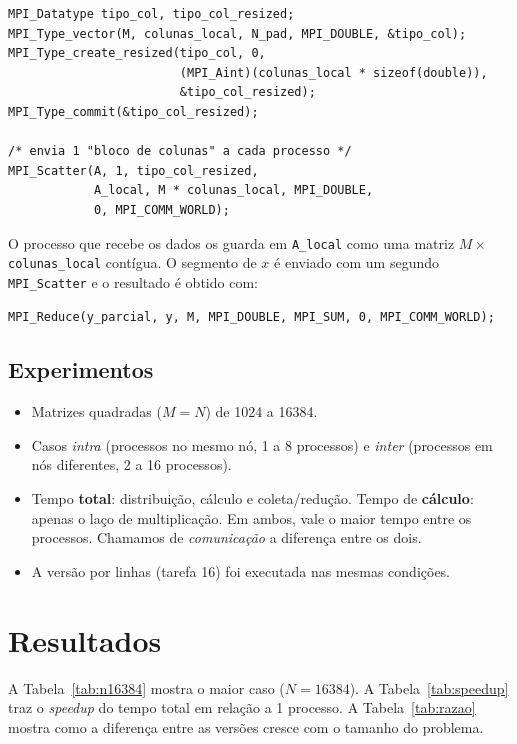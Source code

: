 \documentclass[a4paper,12pt]{article}
\begin{document}
\begin{lstlisting}[style=cstyle, caption={Criação do tipo derivado e uso no Scatter}, label={lst:tipo}]
MPI_Datatype tipo_col, tipo_col_resized;
MPI_Type_vector(M, colunas_local, N_pad, MPI_DOUBLE, &tipo_col);
MPI_Type_create_resized(tipo_col, 0,
                        (MPI_Aint)(colunas_local * sizeof(double)),
                        &tipo_col_resized);
MPI_Type_commit(&tipo_col_resized);

/* envia 1 "bloco de colunas" a cada processo */
MPI_Scatter(A, 1, tipo_col_resized,
            A_local, M * colunas_local, MPI_DOUBLE,
            0, MPI_COMM_WORLD);
\end{lstlisting}

O processo que recebe os dados os guarda em \texttt{A\_local} como uma matriz $M \times$ \texttt{colunas\_local} contígua. O segmento de $x$ é enviado com um segundo \texttt{MPI\_Scatter} e o resultado é obtido com:

\begin{lstlisting}[style=cstyle, caption={Redução dos vetores parciais}]
MPI_Reduce(y_parcial, y, M, MPI_DOUBLE, MPI_SUM, 0, MPI_COMM_WORLD);
\end{lstlisting}

\subsection{Experimentos}

\begin{itemize}
    \item Matrizes quadradas ($M = N$) de 1024 a 16384.
    \item Casos \emph{intra} (processos no mesmo nó, 1 a 8 processos) e \emph{inter} (processos em nós diferentes, 2 a 16 processos).
    \item Tempo \textbf{total}: distribuição, cálculo e coleta/redução. Tempo de \textbf{cálculo}: apenas o laço de multiplicação. Em ambos, vale o maior tempo entre os processos. Chamamos de \emph{comunicação} a diferença entre os dois.
    \item A versão por linhas (tarefa 16) foi executada nas mesmas condições.
\end{itemize}

\section{Resultados}

A Tabela~\ref{tab:n16384} mostra o maior caso ($N = 16384$). A Tabela~\ref{tab:speedup} traz o \emph{speedup} do tempo total em relação a 1 processo. A Tabela~\ref{tab:razao} mostra como a diferença entre as versões cresce com o tamanho do problema.
\end{document}

